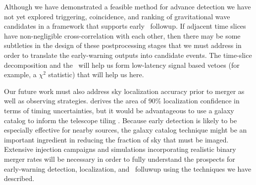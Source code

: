 Although we have demonstrated a feasible method for advance detection we have
not yet explored triggering, coincidence, and ranking of gravitational wave
candidates in a framework that supports early \EM\ followup.  If adjacent time slices
have non-negligible cross-correlation with each other, then there may be some
subtleties in the design of these postprocessing stages that we must address in order
to translate the early-warning outputs into candidate events.  The time-slice
decomposition and the \SVD\ will help us form low-latency signal based vetoes
(for example, a $\chi^2$ statistic) that will help us here.

Our future work must also address sky localization accuracy prior to merger as well as
observing strategies.  \citep{Fairhurst2009} derives the area of 90\% localization
confidence in terms of timing uncertainties, but it would be advantageous to use
a galaxy catalog to inform the telescope tiling \citep{galaxy-catalog}.  Because
early detection is likely to be especially effective for nearby sources, the galaxy
catalog technique might be an important ingredient in reducing the fraction of
sky that must be imaged.  Extensive injection campaigns and simulations
incorporating realistic binary merger rates will be necessary in order to fully
understand the prospects for early-warning detection, localization, and \EM\ folluwup
using the techniques we have described.



